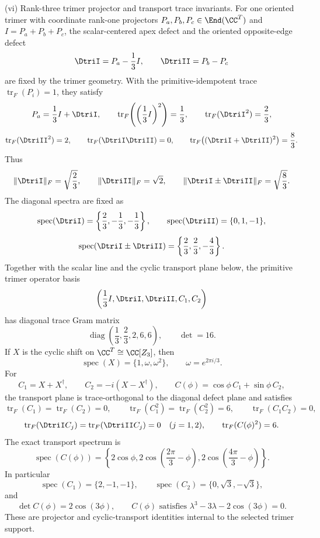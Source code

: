 \documentclass[11pt]{article}
\begin{document}
\begin{theorem}[\(m=1\) finite numerical data]
\smallskip
\noindent\textup{(vi) Rank-three trimer projector and transport trace invariants.}
For one oriented trimer with coordinate rank-one projectors \(P_a,P_b,P_c\in\End(\CC^T)\) and
\(I=P_a+P_b+P_c\), the scalar-centered apex defect and the oriented opposite-edge
defect
\[
    \DtriI=P_a-\frac13I,
    \qquad
    \DtriII=P_b-P_c
\]
are fixed by the trimer geometry.  With the primitive-idempotent trace
\(\operatorname{tr}_F(P_i)=1\), they satisfy
\[
    P_a=\frac13I+\DtriI,
    \qquad
    \operatorname{tr}_F\!\left(\left(\frac13I\right)^2\right)=\frac13,
    \qquad
    \operatorname{tr}_F({\DtriI}^2)=\frac23,
\]
\[
    \operatorname{tr}_F({\DtriII}^2)=2,
    \qquad
    \operatorname{tr}_F(\DtriI\DtriII)=0,
    \qquad
    \operatorname{tr}_F\!\left((\DtriI+\DtriII)^2\right)=\frac83.
\]
Thus
\[
    \|\DtriI\|_F=\sqrt{\frac23},
    \qquad
    \|\DtriII\|_F=\sqrt2,
    \qquad
    \|\DtriI\pm \DtriII\|_F=\sqrt{\frac83}.
\]
The diagonal spectra are fixed as
\[
    \operatorname{spec}(\DtriI)=\left\{\frac23,-\frac13,-\frac13\right\},
    \qquad
    \operatorname{spec}(\DtriII)=\{0,1,-1\},
\]
\[
    \operatorname{spec}(\DtriI\pm \DtriII)=
    \left\{\frac23,\frac23,-\frac43\right\}.
\]
Together with the scalar line and the cyclic transport plane below, the primitive
trimer operator basis
\[
    \left(\frac13I,\DtriI,\DtriII,C_1,C_2\right)
\]
has diagonal trace Gram matrix
\[
    \operatorname{diag}\left(\frac13,\frac23,2,6,6\right),
    \qquad
    \det=16.
\]
If \(X\) is the cyclic shift on \(\CC^T\cong\CC[Z_3]\), then
\[
    \operatorname{spec}(X)=\{1,\omega,\omega^2\},
    \qquad
    \omega=e^{2\pi i/3}.
\]
For
\[
    C_1=X+X^\dagger,
    \qquad
    C_2=-i(X-X^\dagger),
    \qquad
    C(\phi)=\cos\phi\,C_1+\sin\phi\,C_2,
\]
the transport plane is trace-orthogonal to the diagonal defect plane and satisfies
\[
    \operatorname{tr}_F(C_1)=\operatorname{tr}_F(C_2)=0,
    \qquad
    \operatorname{tr}_F(C_1^2)=\operatorname{tr}_F(C_2^2)=6,
    \qquad
    \operatorname{tr}_F(C_1C_2)=0,
\]
\[
    \operatorname{tr}_F(\DtriI C_j)=\operatorname{tr}_F(\DtriII C_j)=0
    \quad (j=1,2),
    \qquad
    \operatorname{tr}_F(C(\phi)^2)=6.
\]
The exact transport spectrum is
\[
    \operatorname{spec}(C(\phi))=
    \left\{2\cos\phi,
    2\cos\left(\frac{2\pi}{3}-\phi\right),
    2\cos\left(\frac{4\pi}{3}-\phi\right)\right\}.
\]
In particular
\[
    \operatorname{spec}(C_1)=\{2,-1,-1\},
    \qquad
    \operatorname{spec}(C_2)=\{0,\sqrt3,-\sqrt3\},
\]
and
\[
    \det C(\phi)=2\cos(3\phi),
    \qquad
    C(\phi)\text{ satisfies }\lambda^3-3\lambda-2\cos(3\phi)=0.
\]
These are projector and cyclic-transport identities internal to the selected
trimer support.


\end{theorem}
\end{document}
